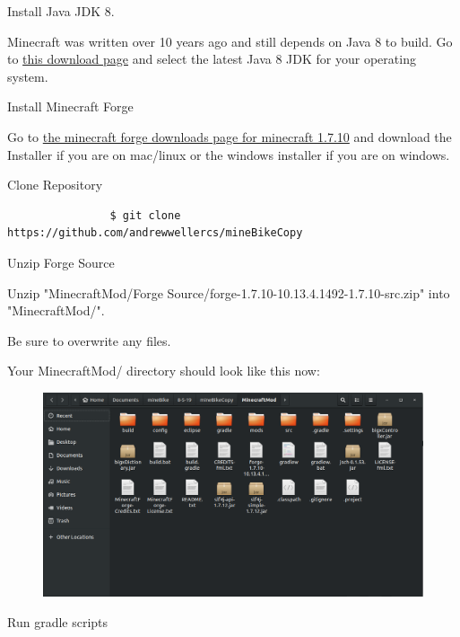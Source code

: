 \documentclass[12pt]{article}
\begin{document}
\begin{steps}
  \item Install Java JDK 8.

	  Minecraft was written over 10 years ago and still depends on Java 8 to build. Go to \href {https://www.oracle.com/technetwork/java/javase/downloads/jdk8-downloads-2133151.html} {this download page} and select the latest Java 8 JDK for your operating system.

  \item Install Minecraft Forge

	  Go to \href {https://files.minecraftforge.net/maven/net/minecraftforge/forge/index\_1.7.10.html} {the minecraft forge downloads page for minecraft 1.7.10} and download the Installer if you are on mac/linux or the windows installer if you are on windows.

  \item Clone Repository
		\begin{verbatim}
				$ git clone https://github.com/andrewwellercs/mineBikeCopy
		\end{verbatim}

  \item Unzip Forge Source

		Unzip "MinecraftMod/Forge Source/forge-1.7.10-10.13.4.1492-1.7.10-src.zip" into "MinecraftMod/".

		Be sure to overwrite any files.

		Your MinecraftMod/ directory should look like this now:
		\begin{figure}[H]
			\includegraphics[scale=0.2]{images/setup/MinecraftModDirectory.png}
			\centering
		\end{figure}



  \item Run gradle scripts


\end{steps}
\end{document}
